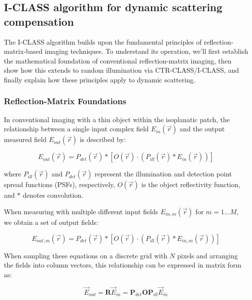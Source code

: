 \documentclass[12pt]{article}
\newenvironment{ourresponse}
    {\begin{tcolorbox}[width=\linewidth,breakable,enhanced,colback=gray!5,colframe=responsecolor!50,title=Response,left=5pt,right=5pt]}
    {\end{tcolorbox}}
\begin{document}


\begin{ourresponse}
\subsection*{I-CLASS algorithm for dynamic scattering compensation}

The I-CLASS algorithm builds upon the fundamental principles of reflection-matrix-based imaging techniques. To understand its operation, we'll first establish the mathematical foundation of conventional reflection-matrix imaging, then show how this extends to random illumination via CTR-CLASS/I-CLASS, and finally explain how these principles apply to dynamic scattering.

\subsubsection*{Reflection-Matrix Foundations}

In conventional imaging with a thin object within the isoplanatic patch, the relationship between a single input complex field $E_{in}(\vec{r})$ and the output measured field $E_{out}(\vec{r})$ is described by:

\begin{equation}
E_{out}(\vec{r}) = P_{det}(\vec{r}) * [O(\vec{r}) \cdot (P_{ill}(\vec{r}) * E_{in}(\vec{r}))]
\end{equation}

where $P_{ill}(\vec{r})$ and $P_{det}(\vec{r})$ represent the illumination and detection point spread functions (PSFs), respectively, $O(\vec{r})$ is the object reflectivity function, and $*$ denotes convolution.

When measuring with multiple different input fields $E_{in,m}(\vec{r})$ for $m=1...M$, we obtain a set of output fields:

\begin{equation}
E_{out,m}(\vec{r}) = P_{det}(\vec{r}) * [O(\vec{r}) \cdot (P_{ill}(\vec{r}) * E_{in,m}(\vec{r}))]
\end{equation}

When sampling these equations on a discrete grid with $N$ pixels and arranging the fields into column vectors, this relationship can be expressed in matrix form as:

\begin{equation}
\vec{E}_{out} = \mathbf{R} \vec{E}_{in} = \mathbf{P}_{det} \mathbf{O} \mathbf{P}_{ill} \vec{E}_{in}
\end{equation}


\end{ourresponse}
\end{document}
